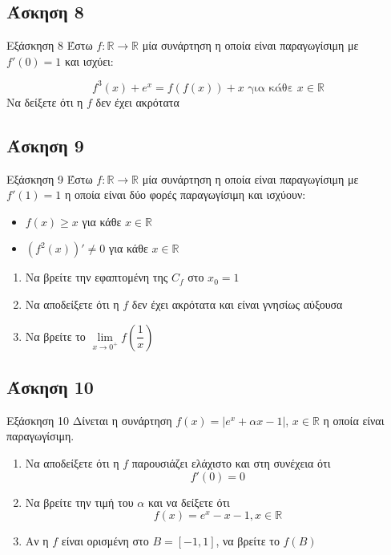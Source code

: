 \documentclass[greek]{beamer}
\begin{document}
\subsection{Άσκηση 8}
\begin{frame}[label=Άσκηση8,t]{Εξάσκηση 8}
 Έστω $f:\mathbb{R}\to\mathbb{R}$ μία συνάρτηση η οποία είναι παραγωγίσιμη με $f'(0)=1$ και ισχύει:

 $$f^3(x)+e^x=f(f(x))+x \text{ για κάθε } x\in\mathbb{R}$$
 Να δείξετε ότι η $f$ δεν έχει ακρότατα

\end{frame}

\subsection{Άσκηση 9}
\begin{frame}[label=Άσκηση9,t]{Εξάσκηση 9}
 Έστω $f:\mathbb{R}\to\mathbb{R}$ μία συνάρτηση η οποία είναι παραγωγίσιμη με $f'(1)=1$ η οποία είναι δύο φορές παραγωγίσιμη και ισχύουν:
 \begin{itemize}
  \item $f(x)\ge x$ για κάθε $x\in\mathbb{R}$
  \item $\left( f^2(x) \right)'\ne 0$ για κάθε $x\in\mathbb{R}$
 \end{itemize}

 \begin{enumerate}
  \item<1-> Να βρείτε την εφαπτομένη της $C_f$ στο $x_0=1$
  \item<2-> Να αποδείξετε ότι η $f$ δεν έχει ακρότατα και είναι γνησίως αύξουσα
  \item<3-> Να βρείτε το $\lim\limits_{x \to 0^+}{ f\left( \dfrac{1}{x} \right) }$
 \end{enumerate}

\end{frame}

\subsection{Άσκηση 10}
\begin{frame}[label=Άσκηση10,t]{Εξάσκηση 10}
 Δίνεται η συνάρτηση $f(x)=|e^x+αx-1|$, $x\in\mathbb{R}$ η οποία είναι παραγωγίσιμη.
 \begin{enumerate}
  \item<1-> Να αποδείξετε ότι η $f$ παρουσιάζει ελάχιστο και στη συνέχεια ότι
   $$f'(0)=0$$
  \item<2-> Να βρείτε την τιμή του $α$ και να δείξετε ότι
   $$f(x)=e^x-x-1,x\in\mathbb{R}$$
  \item<3-> Αν η $f$ είναι ορισμένη στο $Β=[-1,1]$, να βρείτε το $f(Β)$
 \end{enumerate}

\end{frame}
\end{document}
